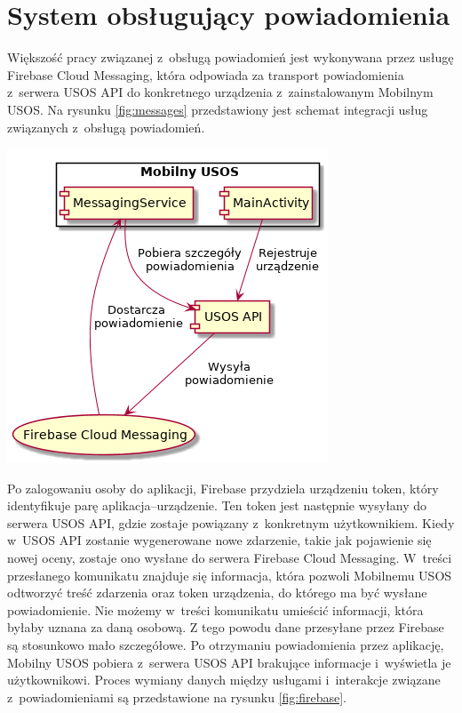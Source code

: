 \documentclass{pracamgr}
\begin{document}
\section{System obsługujący powiadomienia}

Większość pracy związanej z~obsługą powiadomień jest wykonywana przez usługę
Firebase Cloud Messaging, która odpowiada za transport powiadomienia z~serwera
USOS API do konkretnego urządzenia z~zainstalowanym Mobilnym USOS.
Na rysunku \ref{fig:messages} przedstawiony jest schemat integracji usług związanych z~obsługą powiadomień.

\begingroup
\centering
\includegraphics[scale=0.5]{img/messages.png}
\label{fig:messages}
\medskip
\endgroup

Po zalogowaniu osoby do aplikacji, Firebase przydziela urządzeniu token, który
identyfikuje parę aplikacja--urządzenie. Ten token jest następnie wysyłany do
serwera USOS API, gdzie zostaje powiązany z~konkretnym użytkownikiem. Kiedy w~USOS
API zostanie wygenerowane nowe zdarzenie, takie jak pojawienie się nowej oceny,
zostaje ono wysłane do serwera Firebase Cloud Messaging. W~treści przesłanego
komunikatu znajduje się informacja, która pozwoli Mobilnemu USOS odtworzyć treść
zdarzenia oraz token urządzenia, do którego ma być wysłane powiadomienie. Nie
możemy w~treści komunikatu umieścić informacji, która byłaby uznana za daną osobową.
Z tego powodu dane przesyłane przez Firebase są stosunkowo mało szczegółowe. Po
otrzymaniu powiadomienia przez aplikację, Mobilny USOS pobiera z~serwera USOS API
brakujące informacje i~wyświetla je użytkownikowi. Proces wymiany danych między usługami
i~interakcje związane z~powiadomieniami są przedstawione na rysunku \ref{fig:firebase}.
\end{document}
